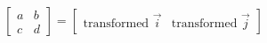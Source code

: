 \documentclass[preview]{standalone}
\begin{document}
\begin{align*}
\begin{bmatrix} a & b \\ c & d \end{bmatrix} =  \begin{bmatrix} \text{transformed }\vec{i} & \text{transformed }\vec{j} \end{bmatrix}
\end{align*}
\end{document}
